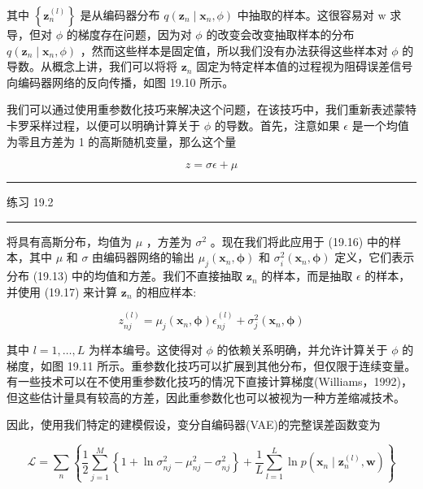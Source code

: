 \documentclass[10pt]{report}
\newcommand{\HRule}{\begin{center}\rule{0.9\linewidth}{0.2mm}\end{center}}
\begin{document}
其中 \(\left\{  {\mathbf{z}}_{n}^{\left( l\right) }\right\}\) 是从编码器分布 \(q\left( {{\mathbf{z}}_{n} \mid  {\mathbf{x}}_{n},\phi }\right)\) 中抽取的样本。这很容易对 \(\mathrm{w}\) 求导，但对 \(\phi\) 的梯度存在问题，因为对 \(\phi\) 的改变会改变抽取样本的分布 \(q\left( {{\mathbf{z}}_{n} \mid  {\mathbf{x}}_{n},\phi }\right)\) ，然而这些样本是固定值，所以我们没有办法获得这些样本对 \(\phi\) 的导数。从概念上讲，我们可以将将 \({\mathbf{z}}_{n}\) 固定为特定样本值的过程视为阻碍误差信号向编码器网络的反向传播，如图 19.10 所示。

我们可以通过使用重参数化技巧来解决这个问题，在该技巧中，我们重新表述蒙特卡罗采样过程，以便可以明确计算关于 \(\phi\) 的导数。首先，注意如果 \(\epsilon\) 是一个均值为零且方差为 1 的高斯随机变量，那么这个量

\[
z = {\sigma \epsilon } + \mu  \tag{19.17}
\]

\HRule

练习 19.2

\HRule

将具有高斯分布，均值为 \(\mu\) ，方差为 \({\sigma }^{2}\) 。现在我们将此应用于 (19.16) 中的样本，其中 \(\mu\) 和 \(\sigma\) 由编码器网络的输出 \({\mu }_{j}\left( {{\mathbf{x}}_{n},\mathbf{\phi }}\right)\) 和 \({\sigma }_{i}^{2}\left( {{\mathbf{x}}_{n},\mathbf{\phi }}\right)\) 定义，它们表示分布 (19.13) 中的均值和方差。我们不直接抽取 \({\mathbf{z}}_{n}\) 的样本，而是抽取 \(\epsilon\) 的样本，并使用 (19.17) 来计算 \({\mathbf{z}}_{n}\) 的相应样本:

\[
{z}_{nj}^{\left( l\right) } = {\mu }_{j}\left( {{\mathbf{x}}_{n},\mathbf{\phi }}\right) {\epsilon }_{nj}^{\left( l\right) } + {\sigma }_{j}^{2}\left( {{\mathbf{x}}_{n},\mathbf{\phi }}\right)  \tag{19.18}
\]

其中 \(l = 1,\ldots ,L\) 为样本编号。这使得对 \(\phi\) 的依赖关系明确，并允许计算关于 \(\phi\) 的梯度，如图 19.11 所示。重参数化技巧可以扩展到其他分布，但仅限于连续变量。有一些技术可以在不使用重参数化技巧的情况下直接计算梯度(Williams，1992)，但这些估计量具有较高的方差，因此重参数化也可以被视为一种方差缩减技术。

因此，使用我们特定的建模假设，变分自编码器(VAE)的完整误差函数变为

\[
\mathcal{L} = \mathop{\sum }\limits_{n}\left\{  {\frac{1}{2}\mathop{\sum }\limits_{{j = 1}}^{M}\left\{  {1 + \ln {\sigma }_{nj}^{2} - {\mu }_{nj}^{2} - {\sigma }_{nj}^{2}}\right\}   + \frac{1}{L}\mathop{\sum }\limits_{{l = 1}}^{L}\ln p\left( {{\mathbf{x}}_{n} \mid  {\mathbf{z}}_{n}^{\left( l\right) },\mathbf{w}}\right) }\right\}   \tag{19.19}
\]
\end{document}
